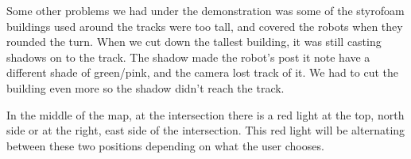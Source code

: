 Some other problems we had under the demonstration was some of the styrofoam buildings used around the tracks were too tall, and covered the robots when they rounded the turn. When we cut down the tallest building, it was still casting shadows on to the track. The shadow made the robot's post it note have a different shade of green/pink, and the camera lost track of it. We had to cut the building even more so the shadow didn't reach the track.

In the middle of the map, at the intersection there is a red light at the top, north side or at the right, east side of the intersection. This red light will be alternating between these two positions depending on what the user chooses. 
\begin{figure}
    \centering
    \hfill
    \hfill

\end{figure}
